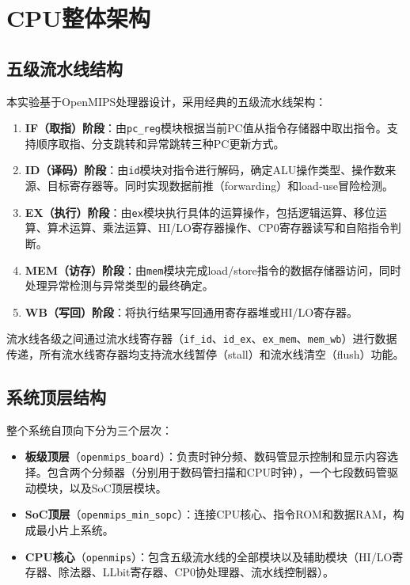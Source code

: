 \section{CPU整体架构}

\subsection{五级流水线结构}

本实验基于OpenMIPS处理器设计，采用经典的五级流水线架构：

\begin{enumerate}[leftmargin=2em]
    \item \textbf{IF（取指）阶段}：由\texttt{pc\_reg}模块根据当前PC值从指令存储器中取出指令。支持顺序取指、分支跳转和异常跳转三种PC更新方式。
    \item \textbf{ID（译码）阶段}：由\texttt{id}模块对指令进行解码，确定ALU操作类型、操作数来源、目标寄存器等。同时实现数据前推（forwarding）和load-use冒险检测。
    \item \textbf{EX（执行）阶段}：由\texttt{ex}模块执行具体的运算操作，包括逻辑运算、移位运算、算术运算、乘法运算、HI/LO寄存器操作、CP0寄存器读写和自陷指令判断。
    \item \textbf{MEM（访存）阶段}：由\texttt{mem}模块完成load/store指令的数据存储器访问，同时处理异常检测与异常类型的最终确定。
    \item \textbf{WB（写回）阶段}：将执行结果写回通用寄存器堆或HI/LO寄存器。
\end{enumerate}

流水线各级之间通过流水线寄存器（\texttt{if\_id}、\texttt{id\_ex}、\texttt{ex\_mem}、\texttt{mem\_wb}）进行数据传递，所有流水线寄存器均支持流水线暂停（stall）和流水线清空（flush）功能。

\subsection{系统顶层结构}

整个系统自顶向下分为三个层次：

\begin{itemize}[leftmargin=2em]
    \item \textbf{板级顶层}（\texttt{openmips\_board}）：负责时钟分频、数码管显示控制和显示内容选择。包含两个分频器（分别用于数码管扫描和CPU时钟），一个七段数码管驱动模块，以及SoC顶层模块。
    \item \textbf{SoC顶层}（\texttt{openmips\_min\_sopc}）：连接CPU核心、指令ROM和数据RAM，构成最小片上系统。
    \item \textbf{CPU核心}（\texttt{openmips}）：包含五级流水线的全部模块以及辅助模块（HI/LO寄存器、除法器、LLbit寄存器、CP0协处理器、流水线控制器）。
\end{itemize}

